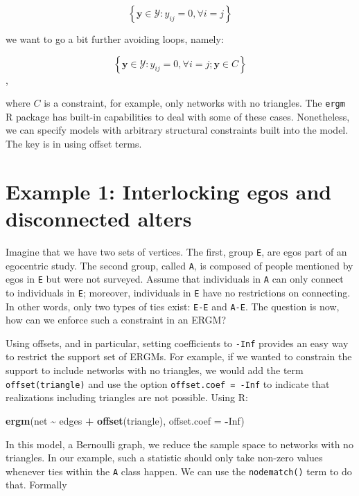 \documentclass[
]{book}
\newenvironment{Shaded}{\begin{snugshade}}{\end{snugshade}}
\newcommand{\AttributeTok}[1]{\textcolor[rgb]{0.13,0.29,0.53}{#1}}
\newcommand{\ConstantTok}[1]{\textcolor[rgb]{0.56,0.35,0.01}{#1}}
\newcommand{\FunctionTok}[1]{\textcolor[rgb]{0.13,0.29,0.53}{\textbf{#1}}}
\newcommand{\NormalTok}[1]{#1}
\newcommand{\SpecialCharTok}[1]{\textcolor[rgb]{0.81,0.36,0.00}{\textbf{#1}}}
\begin{document}
\[
\left\{\mathbf{y} \in \mathcal{Y}: y_{ij} = 0, \forall i = j\right\}
\]

\noindent we want to go a bit further avoiding loops, namely:

\[
\left\{\mathbf{y} \in \mathcal{Y}: y_{ij} = 0, \forall i = j; \mathbf{y} \in C\right\}
\],

\noindent where \(C\) is a constraint, for example, only networks with no triangles. The \texttt{ergm} R package has built-in capabilities to deal with some of these cases. Nonetheless, we can specify models with arbitrary structural constraints built into the model. The key is in using offset terms.

\hypertarget{example-1-interlocking-egos-and-disconnected-alters}{%
\section{Example 1: Interlocking egos and disconnected alters}\label{example-1-interlocking-egos-and-disconnected-alters}}

Imagine that we have two sets of vertices. The first, group \texttt{E}, are egos part of an egocentric study. The second group, called \texttt{A}, is composed of people mentioned by egos in \texttt{E} but were not surveyed. Assume that individuals in \texttt{A} can only connect to individuals in \texttt{E}; moreover, individuals in \texttt{E} have no restrictions on connecting. In other words, only two types of ties exist: \texttt{E-E} and \texttt{A-E}. The question is now, how can we enforce such a constraint in an ERGM?

Using offsets, and in particular, setting coefficients to \texttt{-Inf} provides an easy way to restrict the support set of ERGMs. For example, if we wanted to constrain the support to include networks with no triangles, we would add the term \texttt{offset(triangle)} and use the option \texttt{offset.coef\ =\ -Inf} to indicate that realizations including triangles are not possible. Using R:

\begin{Shaded}
\begin{Highlighting}[]
\FunctionTok{ergm}\NormalTok{(net }\SpecialCharTok{\textasciitilde{}}\NormalTok{ edges }\SpecialCharTok{+} \FunctionTok{offset}\NormalTok{(triangle), }\AttributeTok{offset.coef =} \SpecialCharTok{{-}}\ConstantTok{Inf}\NormalTok{)}
\end{Highlighting}
\end{Shaded}

In this model, a Bernoulli graph, we reduce the sample space to networks with no triangles. In our example, such a statistic should only take non-zero values whenever ties within the \texttt{A} class happen. We can use the \texttt{nodematch()} term to do that. Formally
\end{document}
